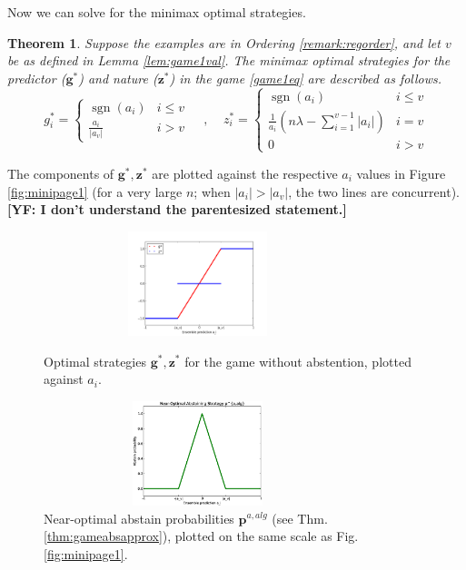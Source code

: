 \documentclass{article}[12pt]
\newcommand{\yoav}[1]{{\bf [YF: #1]}}
\newtheorem{thm}{Theorem}%
\theoremstyle{named}
\newcommand{\vg}{\mathbf{g}}    %
\newcommand{\vp}{\mathbf{p}}
\newcommand{\vz}{\mathbf{z}}
\DeclareMathOperator{\sgn}{sgn}
\newcommand{\abs}[1]{\left| #1 \right|}
\newcommand{\lrp}[1]{\left(#1\right)}
\begin{document}
Now we can solve for the minimax optimal strategies.
\begin{thm}
\label{thm:game1soln}
Suppose the examples are in Ordering \ref{remark:regorder}, 
and let $v$ be as defined in Lemma \ref{lem:game1val}. 
The minimax optimal strategies for the predictor ($\vg^*$) and nature ($\vz^*$) 
in the game \eqref{game1eq} are described as follows.
$$ g_i^* = \begin{cases} \sgn(a_i) & i \leq v \\ \frac{a_i}{\abs{a_v}} & i > v \end{cases} \;\;\;\;,
\;\;\;\; z_i^* = \begin{cases} \sgn(a_i) & i \leq v \\ \frac{1}{a_i} \lrp{ n \lambda - \sum_{i=1}^{v-1} \abs{a_i} } & 
i = v \\ 0 & i > v \end{cases} $$
\end{thm}
The components of $\vg^*, \vz^*$ are plotted against the respective $a_i$ values in Figure \ref{fig:minipage1} 
(for a very large $n$; when $\abs{a_i} > \abs{a_v}$, the two lines are concurrent).
\yoav{I don't understand the parentesized statement.}

\begin{figure}[b]
\centering
\begin{minipage}[b]{0.45\linewidth}
\centering
\includegraphics[height=1.2in, width=0.8\textwidth]{figures/mmxoptstrat}
\caption{Optimal strategies $\vg^*, \vz^*$ for the game without abstention, plotted against $a_i$. }
\label{fig:minipage1}
\end{minipage}
\quad
\begin{minipage}[b]{0.45\linewidth}
\centering
\includegraphics[height=1.2in, width=0.8\textwidth]{figures/abststrat}
\caption{Near-optimal abstain probabilities $\vp^{a,alg}$ (see Thm. \ref{thm:gameabsapprox}), plotted on the same scale as Fig. \ref{fig:minipage1}.}
\label{fig:minipage2}
\end{minipage}
\end{figure}
\end{document}
